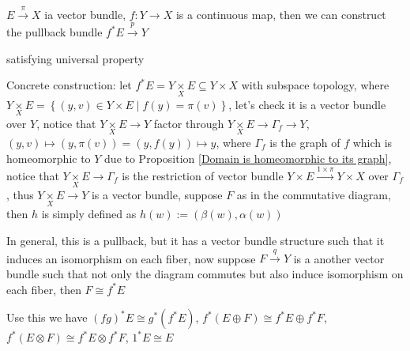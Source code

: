 \documentclass[main]{subfiles}
\begin{document}
\begin{definition}
$E\overset{\pi}{\to}X$ ia vector bundle, $f:Y\to X$ is a continuous map, then we can construct the pullback bundle $f^*E\overset{p}{\to} Y$ \par
\begin{center}
\end{center}
satisfying universal property \par
\begin{center}
\end{center}
Concrete construction: let $f^*E=Y\underset{X}{\times} E\subseteq Y\times X$ with subspace topology, where $Y\underset{X}{\times}E=\left\{(y,v)\in Y\times E\middle|f(y)=\pi(v)\right\}$, let's check it is a vector bundle over $Y$, notice that $Y\underset{X}{\times}E\to Y$ factor through $Y\underset{X}{\times}E\to \Gamma_f\to Y$, $(y,v)\mapsto (y,\pi(v))=(y,f(y))\mapsto y$, where $\Gamma_f$ is the graph of $f$ which is homeomorphic to $Y$ due to Proposition \ref{Domain is homeomorphic to its graph}, notice that $Y\underset{X}{\times}E\to\Gamma_f$ is the restriction of vector bundle $Y\times E\xrightarrow{1\times \pi}Y\times X$ over $\Gamma_f$, thus $Y\underset{X}{\times}E\to Y$ is a vector bundle, suppose $F$ as in the commutative diagram, then $h$ is simply defined as $h(w):=(\beta(w),\alpha(w))$ \par
\end{definition}

\begin{remark}
In general, this is a pullback, but it has a vector bundle structure such that it induces an isomorphism on each fiber, now suppose $F\xrightarrow{q} Y$ is a another vector bundle such that not only the diagram commutes but also induce isomorphism on each fiber, then $F\cong f^*E$ \par
Use this we have $(fg)^*E\cong g^*(f^*E)$, $f^*(E\oplus F)\cong f^*E\oplus f^*F$, $f^*(E\otimes F)\cong f^*E\otimes f^*F$, $1^*E\cong E$
\end{remark}
\end{document}
